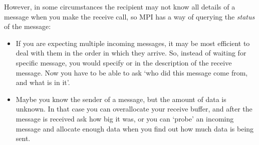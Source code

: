However, in some circumstances the recipient may not know all details of a
message when you make the receive call, so MPI has a way of querying
the \emph{status} of the message:
\begin{itemize}
\item If you are expecting multiple incoming messages, it may be most
  efficient to deal with them in the order in which they arrive. So,
  instead of waiting for specific message, you would specify
   or  in
  the description of the receive message. 
  Now you have to be able to ask `who did this message come from,
  and what is in it'.
\item Maybe you know the sender of a message, but the amount of data
  is unknown. In that case you can overallocate your receive buffer,
  and after the message is received ask how big it was, or you can
  `probe' an incoming message and allocate enough data when you find
  out how much data is being sent.
\end{itemize}


\endinput

\Level 1 {Examples}

\mpiexample{MPI_Send}

A regular ping-pong operation with \indexmpishow{MPI_Send} and
\indexmpishow{MPI_Recv}. We repeat the experiment multiple times to
get a reliable measurement of the time taken.
%
\cverbatimsnippet{pingpong}
%
\pverbatimsnippet{pingpongp}
%
\pverbatimsnippet{pingpongpp}

\mpiexample{MPI_Recv}


\mpiexample{MPI_Sendrecv}

We set up a ring structure and use \indexmpishow{MPI_Sendrecv} to communicate
between pairs.
%
\cverbatimsnippet{sendrecvring}

\Level 1 {Review}

Do the following codes:
\begin{enumerate}
\item always work;
\item sometimes deadlock; or
\item always deadlock?
\end{enumerate}
In the `sometimes' case, indicate when it will work and when not.

\begin{lstlisting}
if (procid==0)
  MPI_Send( /* to: */ 1 );
else
  MPI_Recv( /* from: */ 0 );
\end{lstlisting}

\begin{lstlisting}
otherid = nprocs - procid;
MPI_Send( /* to: */ otherid);
MPI_Recv( /* from: */ otherid );
\end{lstlisting}

\begin{lstlisting}
if (procid==0)
  for (int otherid=1; otherid<nprocs; otherid++)
    MPI_Send( /* to: */ otherid );
else
  for (int otherid=0; otherid<nprocs; otherid++)
    MPI_Recv( /* from: */ otherid );
\end{lstlisting}

